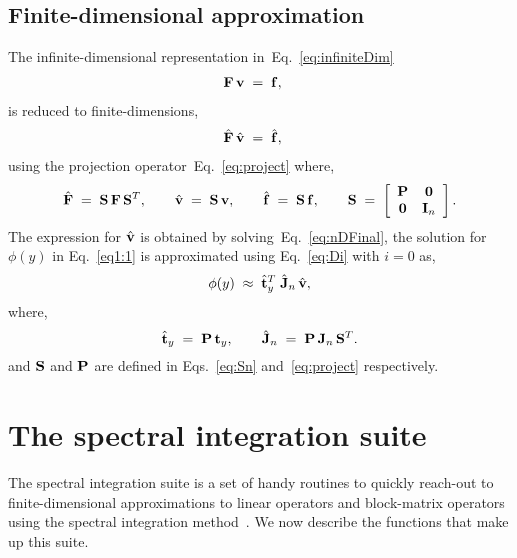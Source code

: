 \documentclass[%
secnumarabic,%
 amssymb, amsmath,%
 aps,prf,superscriptaddress,longbibliography
frontmatterverbose,
]{revtex4-2}
\begin{document}
\subsection{Finite-dimensional approximation}
The infinite-dimensional representation in~Eq.~\eqref{eq:infiniteDim}
  \begin{align}
    \mathbf{F} \,\mathbf{v}\;&=\; \mathbf{f},
  \end{align}
is reduced to finite-dimensions,
\begin{align}\label{eq:nDFinal}
    \hat{\mathbf{F}} \,\hat{\mathbf{v}}\;&=\; \hat{\mathbf{f}},
  \end{align}
  using the projection operator~Eq.~\eqref{eq:project} where,
  \begin{equation}\label{eq:Sn}
    \hat{\mathbf{F}} \;=\;  \mathbf{S} \,\mathbf{F} \,\mathbf{S}^T, \qquad \hat{\mathbf{v}} \;=\; \mathbf{S}\, \mathbf{v}, \qquad \hat{\mathbf{f}} \;=\; \mathbf{S}\, \mathbf{f}, \qquad \mathbf{S} \;=\; \left[\begin{array}{cc}
    \mathbf{P} & \mathbf 0 \\
    \mathbf 0 & \mathbf{I}_n
    \end{array}\right] .
  \end{equation}
The expression for $\hat{\mathbf{v}}$ is obtained by solving~Eq.~\eqref{eq:nDFinal}, the solution for $\phi (y)$ in Eq.~\eqref{eq1:1} is approximated using Eq.~\eqref{eq:Di} with $i = 0$ as,
$$
\phi (y) \;\approx\; \hat{\mathbf{t}}_y^T \; \hat{\mathbf{J}}_n\, \hat{\mathbf{v}},
$$ 
where,
$$
\hat{\mathbf{t}}_y \;=\; \mathbf{P}\,\mathbf{t}_y, \qquad \hat {\mathbf{J}}_n \;=\; \mathbf{P} \,\mathbf J_n\, \mathbf{S}^T.
$$
and $\mathbf{S}$ and $\mathbf{P}$ are defined in Eqs.~\eqref{eq:Sn} and~\eqref{eq:project} respectively.
\section{The spectral integration suite}
The spectral integration suite is a set of handy routines to quickly reach-out to finite-dimensional approximations to linear operators and block-matrix operators using the spectral integration method~\cite{DuSIAM2016,GreSIAM91}. We now describe the functions that make up this suite. 
\end{document}
